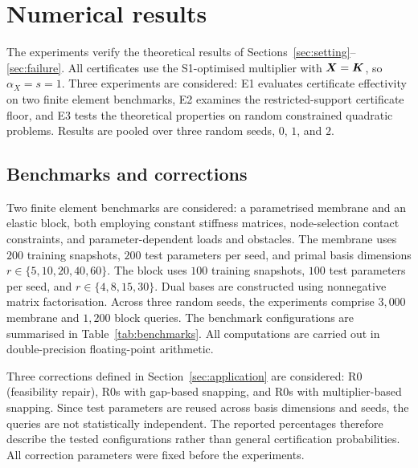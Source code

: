 \section{Numerical results}\label{sec:results}

The experiments verify the theoretical results of Sections~\ref{sec:setting}--\ref{sec:failure}.
All certificates use the S1-optimised multiplier with $\boldsymbol{X}=\boldsymbol{K}$, so $\alpha_X=s=1$. Three experiments are considered: E1 evaluates certificate
effectivity on two finite element benchmarks, E2 examines the restricted-support certificate floor, and E3 tests the theoretical properties on
random constrained quadratic problems. Results are pooled over three random seeds, $0$, $1$, and $2$.

\subsection{Benchmarks and corrections}\label{sec:setup}
\begin{table}[t]
\centering\small
\caption{The finite element benchmarks (read from the benchmark definitions and the settings of the code base).}
\label{tab:benchmarks}

\end{table}

Two finite element benchmarks are considered: a parametrised membrane and an elastic block, both employing constant stiffness matrices, node-selection contact constraints, and parameter-dependent loads and obstacles. The membrane uses $200$ training snapshots, $200$ test parameters per seed, and primal basis dimensions $r\in\{5,10,20,40,60\}$. The block uses $100$ training snapshots, $100$ test parameters per seed, and $r\in\{4,8,15,30\}$. Dual bases are constructed using nonnegative matrix factorisation. Across three random seeds, the experiments comprise $3{,}000$ membrane and $1{,}200$ block queries. The benchmark configurations are summarised in Table~\ref{tab:benchmarks}. All computations are carried out in double-precision floating-point arithmetic.

Three corrections defined in Section~\ref{sec:application} are considered: R0 (feasibility repair), R0s with gap-based snapping, and R0s with
multiplier-based snapping. Since test parameters are reused across basis dimensions and seeds, the queries are not statistically independent. The
reported percentages therefore describe the tested configurations rather than general certification probabilities. All correction parameters were
fixed before the experiments.


